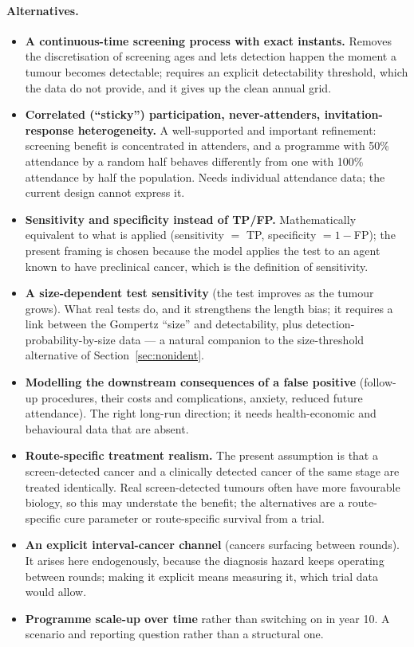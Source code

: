 \documentclass[12pt,a4paper]{article}
\newcommand{\alt}[1]{\paragraph{Alternatives.} #1}
\begin{document}
\alt{\begin{itemize}[nosep]
  \item \textbf{A continuous-time screening process with exact instants.} Removes the discretisation of
        screening ages and lets detection happen the moment a tumour becomes detectable; requires an
        explicit detectability threshold, which the data do not provide, and it gives up the clean annual
        grid.
  \item \textbf{Correlated (``sticky'') participation, never-attenders, invitation-response
        heterogeneity.} A well-supported and important refinement: screening benefit is concentrated in
        attenders, and a programme with 50\% attendance by a random half behaves differently from one with
        100\% attendance by half the population. Needs individual attendance data; the current design
        cannot express it.
  \item \textbf{Sensitivity and specificity instead of TP/FP.} Mathematically equivalent to what is applied
        (sensitivity $=$ TP, specificity $=1-$FP); the present framing is chosen because the model applies
        the test to an agent known to have preclinical cancer, which is the definition of sensitivity.
  \item \textbf{A size-dependent test sensitivity} (the test improves as the tumour grows). What real tests
        do, and it strengthens the length bias; it requires a link between the Gompertz ``size'' and
        detectability, plus detection-probability-by-size data --- a natural companion to the
        size-threshold alternative of Section~\ref{sec:nonident}.
  \item \textbf{Modelling the downstream consequences of a false positive} (follow-up procedures, their
        costs and complications, anxiety, reduced future attendance). The right long-run direction; it
        needs health-economic and behavioural data that are absent.
  \item \textbf{Route-specific treatment realism.} The present assumption is that a screen-detected cancer
        and a clinically detected cancer of the same stage are treated identically. Real screen-detected
        tumours often have more favourable biology, so this may understate the benefit; the alternatives
        are a route-specific cure parameter or route-specific survival from a trial.
  \item \textbf{An explicit interval-cancer channel} (cancers surfacing between rounds). It arises here
        endogenously, because the diagnosis hazard keeps operating between rounds; making it explicit
        means measuring it, which trial data would allow.
  \item \textbf{Programme scale-up over time} rather than switching on in year 10. A scenario and
        reporting question rather than a structural one.
\end{itemize}}
\end{document}
